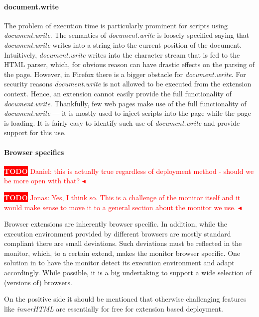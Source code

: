 \documentclass{llncs}
\newcommand{\todo}[1]{\colorbox{red}{\textcolor{white}{\sffamily\bfseries\scriptsize TODO}} \textcolor{red}{#1} \textcolor{red}{$\blacktriangleleft$}}
\begin{document}
\paragraph{document.write} The problem of execution time is particularly
prominent for scripts using \emph{document.write}. The semantics of
\emph{document.write} is loosely specified saying that \emph{document.write}
writes into a string into the current position of the document.  Intuitively,
\emph{document.write} writes into the character stream that is fed to the HTML
parser, which, for obvious reason can have drastic effects on the parsing of
the page.  However, in Firefox there is a bigger obstacle for
\emph{document.write}. For security reasons \emph{document.write} is not
allowed to be executed from the extension context.  Hence, an extension cannot
easily provide the full functionality of \emph{document.write}.  Thankfully,
few web pages make use of the full functionality of \emph{document.write} ---
it is mostly used to inject scripts into the page while the page is loading. It
is fairly easy to identify such use of \emph{document.write} and provide
support for this use.


\paragraph{Browser specifics}

\todo{Daniel: this is actually true regardless of deployment method - should we be more open with that?}

\todo{Jonas: Yes, I think so. This is a challenge of the monitor itself and it would make sense to move it to a general section about the monitor we use.}

Browser extensions are inherently browser specific. In addition, while the
execution environment provided by different browsers are mostly standard
compliant there are small deviations. Such deviations must be reflected in 
the monitor, which, to a certain extend, makes the monitor browser specific.
One solution in to have the monitor detect its execution environment
and adapt accordingly. While possible, it is a big undertaking to support
a wide selection of (versions of) browsers.


On the positive side it should be mentioned that otherwise challenging features
like \emph{innerHTML} are essentially for free for extension based deployment.
\end{document}
